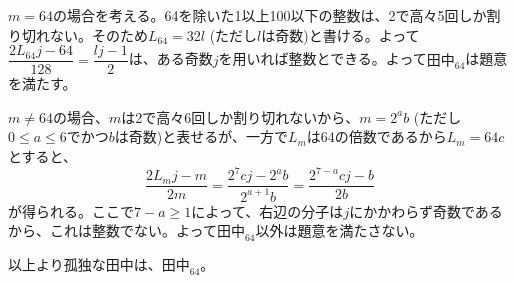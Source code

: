$m=64$の場合を考える。64を除いた1以上100以下の整数は、2で高々5回しか割り切れない。そのため$L_{64}=32l$ (ただし$l$は奇数)と書ける。よって$\dfrac{2L_{64}j-64}{128}=\dfrac{lj-1}{2}$は、ある奇数$j$を用いれば整数とできる。よって$\text{田中}_{64}$は題意を満たす。

$m\neq 64$の場合、$m$は2で高々6回しか割り切れないから、$m=2^ab$ (ただし$0\le a\le 6$でかつ$b$は奇数)と表せるが、一方で$L_m$は64の倍数であるから$L_m=64c$とすると、
\[ \frac{2L_mj-m}{2m}=\frac{2^7cj-2^ab}{2^{a+1}b}=\frac{2^{7-a}cj-b}{2b} \]
が得られる。ここで$7-a\ge 1$によって、右辺の分子は$j$にかかわらず奇数であるから、これは整数でない。よって$\text{田中}_{64}$以外は題意を満たさない。

以上より孤独な田中は、$\text{田中}_{64}$。

